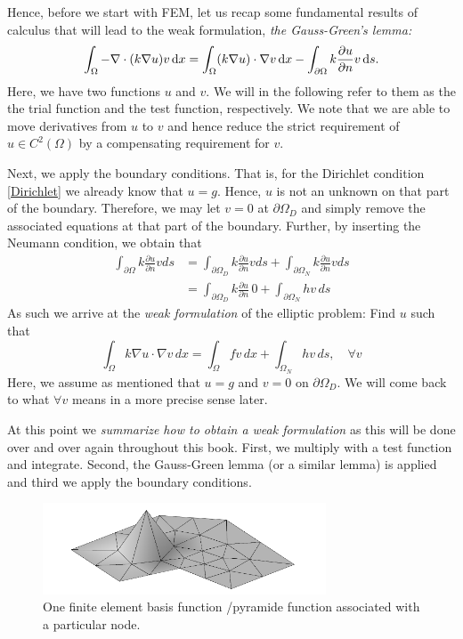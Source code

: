 Hence, before we start with FEM, let us recap some fundamental results of calculus that will lead to the weak formulation, \emph{the 
Gauss-Green's lemma:} 
\begin{equation}
\label{gaussgreen}
\int_\Omega 
-\nabla\cdot(k\nabla u) v \, \mathrm{d}x =  
\int_\Omega (k\nabla u) \cdot \nabla v \, \mathrm{d}x  - \int_{\partial \Omega} k\frac{\partial u} {\partial n} v  \, \mathrm{d}s .  
\end{equation}
Here, we have two functions $u$ and $v$. We will in the following refer to them as the the trial function  and the test function, respectively. We note that we are able to move derivatives from $u$ to $v$ and hence reduce the 
strict requirement of $u\in C^2(\Omega)$ by a compensating requirement for $v$.  

Next,   
we apply the boundary conditions. That is, for the Dirichlet
condition \eqref{Dirichlet} we already know that $u=g$. Hence, $u$ is not an unknown on that part of the boundary.  Therefore,  we may  
let $v=0$ at $\partial \Omega_D$ and simply remove the associated equations at that part of the boundary. Further, by inserting the Neumann condition, we obtain that  
\begin{align}
	\int_{\partial \Omega} k\frac{\partial u} {\partial n} v ds &=   
\int_{\partial \Omega_D} k\frac{\partial u} {\partial n} v ds +   \int_{\partial \Omega_N} k\frac{\partial u} {\partial n} v ds  \\   
	&= \int_{\partial \Omega_D} k\frac{\partial u} {\partial n} \, 0 +   \int_{\partial \Omega_N} h v \, ds   
\end{align}
As such we arrive at the \emph{weak formulation} of the elliptic problem: 
Find $u$ such that 
\begin{equation}
\label{weakform}
\int_\Omega k \nabla u \cdot \nabla v \, dx = \int_\Omega f v \, dx + \int_{\Omega_N} h v \, ds, \quad \forall v  
\end{equation}
Here, we assume as mentioned that $u=g$ and $v=0$ on $\partial \Omega_D$. We will come back to what $\forall v$ means in a 
more precise sense later.  

At this point we \emph{summarize how to obtain a weak formulation} as this will be done over and over again throughout this book.  
First, we multiply with a test function and integrate. Second, the Gauss-Green lemma (or a similar lemma) is applied and third
we apply the boundary conditions. 

\begin{figure}
\begin{center}
\includegraphics[width=0.75\textwidth]{chapters/elliptic/pics/fem.png}
\caption{One finite element basis function /pyramide function associated with a particular node.}
\label{fig:fembasis}
\end{center}
\end{figure}


